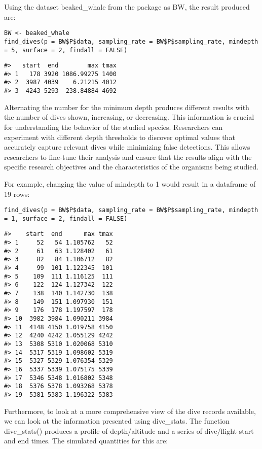 Using the dataset beaked\_whale from the package as BW, the result produced are:

\begin{verbatim}
BW <- beaked_whale
find_dives(p = BW$P$data, sampling_rate = BW$P$sampling_rate, mindepth = 5, surface = 2, findall = FALSE)
\end{verbatim}

\begin{verbatim}
#>   start  end        max tmax
#> 1   178 3920 1086.99275 1400
#> 2  3987 4039    6.21215 4012
#> 3  4243 5293  238.84884 4692
\end{verbatim}

Alternating the number for the minimum depth produces different results with the number of dives shown, increasing, or decreasing. This information is crucial for understanding the behavior of the studied species. Researchers can experiment with different depth thresholds to discover optimal values that accurately capture relevant dives while minimizing false detections. This allows researchers to fine-tune their analysis and ensure that the results align with the specific research objectives and the characteristics of the organisms being studied.

For example, changing the value of mindepth to 1 would result in a dataframe of 19 rows:

\begin{verbatim}
find_dives(p = BW$P$data, sampling_rate = BW$P$sampling_rate, mindepth = 1, surface = 2, findall = FALSE)
\end{verbatim}

\begin{verbatim}
#>    start  end      max tmax
#> 1     52   54 1.105762   52
#> 2     61   63 1.128402   61
#> 3     82   84 1.106712   82
#> 4     99  101 1.122345  101
#> 5    109  111 1.116125  111
#> 6    122  124 1.127342  122
#> 7    138  140 1.142730  138
#> 8    149  151 1.097930  151
#> 9    176  178 1.197597  178
#> 10  3982 3984 1.090211 3984
#> 11  4148 4150 1.019758 4150
#> 12  4240 4242 1.055129 4242
#> 13  5308 5310 1.020068 5310
#> 14  5317 5319 1.098602 5319
#> 15  5327 5329 1.076354 5329
#> 16  5337 5339 1.075175 5339
#> 17  5346 5348 1.016802 5348
#> 18  5376 5378 1.093268 5378
#> 19  5381 5383 1.196322 5383
\end{verbatim}

Furthermore, to look at a more comprehensive view of the dive records available, we can look at the information presented using dive\_stats. The function dive\_stats() produces a profile of depth/altitude and a series of dive/flight start and end times. The simulated quantities for this are:

